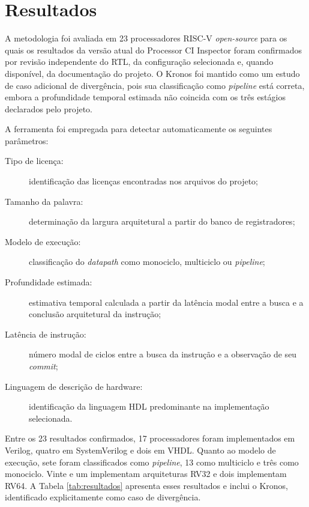 \section{Resultados}\label{sec:Resultados}

A metodologia foi avaliada em 23 processadores RISC-V \textit{open-source}
para os quais os resultados da versão atual do Processor CI Inspector foram
confirmados por revisão independente do RTL, da configuração selecionada e,
quando disponível, da documentação do projeto. O Kronos foi mantido como um
estudo de caso adicional de divergência, pois sua classificação como
\textit{pipeline} está correta, embora a profundidade temporal estimada não
coincida com os três estágios declarados pelo projeto.

A ferramenta foi empregada para detectar automaticamente os seguintes
parâmetros:

\begin{description}
  \item[Tipo de licença:] identificação das licenças encontradas nos arquivos
  do projeto;
  \item[Tamanho da palavra:] determinação da largura arquitetural a partir do
  banco de registradores;
  \item[Modelo de execução:] classificação do \textit{datapath} como
  monociclo, multiciclo ou \textit{pipeline};
  \item[Profundidade estimada:] estimativa temporal calculada a partir da
  latência modal entre a busca e a conclusão arquitetural da instrução;
  \item[Latência de instrução:] número modal de ciclos entre a busca da
  instrução e a observação de seu \textit{commit};
  \item[Linguagem de descrição de hardware:] identificação da linguagem HDL
  predominante na implementação selecionada.
\end{description}

Entre os 23 resultados confirmados, 17 processadores foram implementados em
Verilog, quatro em SystemVerilog e dois em VHDL. Quanto ao modelo de execução,
sete foram classificados como \textit{pipeline}, 13 como multiciclo e três
como monociclo. Vinte e um implementam arquiteturas RV32 e dois implementam
RV64. A Tabela \ref{tab:resultados} apresenta esses resultados e inclui o
Kronos, identificado explicitamente como caso de divergência.

